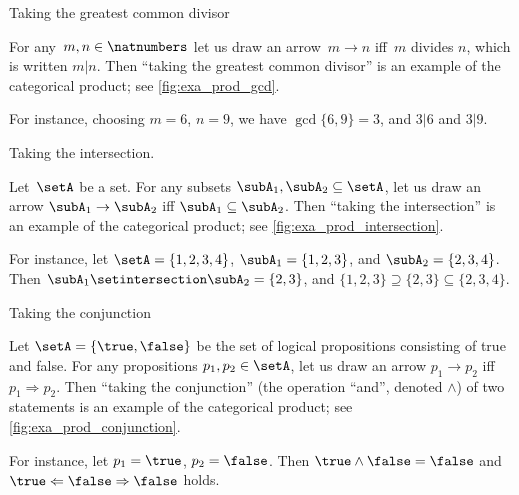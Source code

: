 \begin{marginfigure}
	\centering
	\caption{Taking the greatest common divisor}
	\label{fig:exa_prod_gcd}
\end{marginfigure}

\begin{example}
	\label{exa:gcd-as-prod}
	For any~$m, n \in \natnumbers$ let us draw an arrow~$m \to n$ iff~$m$ divides $n$, which is written $m | n$.
	Then ``taking the greatest common divisor'' is an example of the categorical product; see \cref{fig:exa_prod_gcd}.

	For instance, choosing $m = 6$, $n = 9$, we have $\gcd \{6, 9 \} = 3$, and $3 | 6$ and $3 | 9$.
\end{example}

\begin{marginfigure}
	\centering
	\caption{Taking the intersection.}
	\label{fig:exa_prod_intersection}
\end{marginfigure}

\begin{example}
	\label{exa:intersection-as-prod}
	Let~$\setA$ be a set.
	For any subsets $\subA_1, \subA_2 \subseteq \setA$, let us draw an arrow $\subA_1 \to \subA_2$ iff $\subA_1 \subseteq \subA_2$.
	Then ``taking the intersection'' is an example of the categorical product; see \cref{fig:exa_prod_intersection}.

	For instance, let $\setA = \{ 1, 2, 3, 4 \}$, $\subA_1 = \{ 1, 2, 3 \}$, and $\subA_2 = \{2, 3, 4 \}$.
	Then $\subA_1 \setintersection \subA_2 = \{2, 3 \}$, and $\{ 1, 2, 3 \} \supseteq \{2, 3 \} \subseteq \{2, 3, 4 \}$.
\end{example}

\begin{marginfigure}
	\centering
	\caption{Taking the conjunction}
	\label{fig:exa_prod_conjunction}
\end{marginfigure}

\begin{example}
	\label{exa:conjunction-as-prod}
	Let $\setA = \{ \true, \false \}$ be the set of logical propositions consisting of true and false.
	For any propositions $p_1, p_2  \in \setA$, let us draw an arrow $p_1 \to p_2$ iff $p_1 \Rightarrow p_2$.
	Then ``taking the conjunction'' (the operation ``and'', denoted $\wedge$) of two statements is an example of the categorical product; see \cref{fig:exa_prod_conjunction}.

	For instance, let $p_1 = \true$, $p_2 = \false$.
	Then $\true \wedge \false = \false$ and $\true \Leftarrow \false \Rightarrow \false$ holds.
\end{example}

